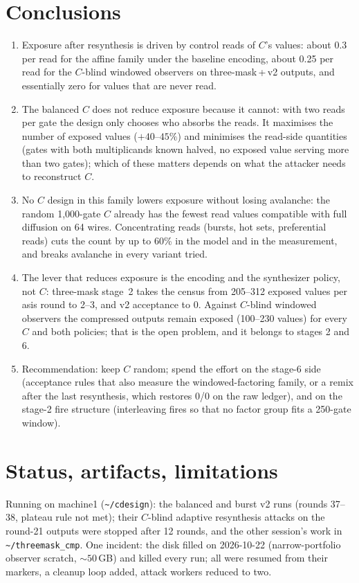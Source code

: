 \documentclass[11pt]{article}
\newcommand{\code}[1]{\texttt{#1}}
\begin{document}
\section{Conclusions}
\begin{enumerate}
\item Exposure after resynthesis is driven by control reads of $C$'s values: about 0.3 per read for the affine family under the baseline encoding, about 0.25 per read for the $C$-blind windowed observers on three-mask\,+\,v2 outputs, and essentially zero for values that are never read.
\item The balanced $C$ does not reduce exposure because it cannot: with two reads per gate the design only chooses who absorbs the reads. It maximises the number of exposed values ($+40$--$45\%$) and minimises the read-side quantities (gates with both multiplicands known halved, no exposed value serving more than two gates); which of these matters depends on what the attacker needs to reconstruct $C$.
\item No $C$ design in this family lowers exposure without losing avalanche: the random 1,000-gate $C$ already has the fewest read values compatible with full diffusion on 64 wires. Concentrating reads (bursts, hot sets, preferential reads) cuts the count by up to 60\% in the model and in the measurement, and breaks avalanche in every variant tried.
\item The lever that reduces exposure is the encoding and the synthesizer policy, not $C$: three-mask stage~2 takes the census from 205--312 exposed values per asis round to 2--3, and v2 acceptance to 0. Against $C$-blind windowed observers the compressed outputs remain exposed (100--230 values) for every $C$ and both policies; that is the open problem, and it belongs to stages 2 and 6.
\item Recommendation: keep $C$ random; spend the effort on the stage-6 side (acceptance rules that also measure the windowed-factoring family, or a remix after the last resynthesis, which restores 0/0 on the raw ledger), and on the stage-2 fire structure (interleaving fires so that no factor group fits a 250-gate window).
\end{enumerate}

\section{Status, artifacts, limitations}\label{sec:status}
Running on machine1 (\code{\textasciitilde/cdesign}): the balanced and burst v2 runs (rounds 37--38, plateau rule not met); their $C$-blind adaptive resynthesis attacks on the round-21 outputs were stopped after 12 rounds, and the other session's work in \code{\textasciitilde/threemask\_cmp}. One incident: the disk filled on 2026-10-22 (narrow-portfolio observer scratch, ${\sim}50$\,GB) and killed every run; all were resumed from their markers, a cleanup loop added, attack workers reduced to two.
\end{document}
